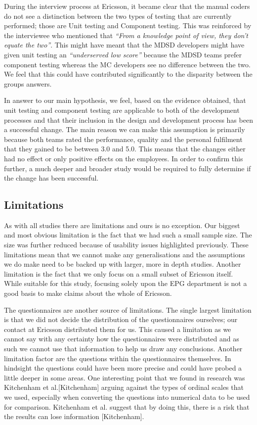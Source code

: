 \documentclass[final_report_innit.tex]{subfiles}
\begin{document}
During the interview process at Ericsson, it became clear that the manual coders do not see a distinction between the two types of
testing that are currently performed; those are Unit testing and Component testing. This was reinforced by the interviewee who mentioned that \textit{``From a knowledge point of view, they don't equate the two''}. This might have meant that the MDSD developers might have given unit testing an \textit{``underserved low score''} because the MDSD teams prefer component testing whereas the MC developers see no difference between the two. We feel that this could have contributed significantly to the disparity between the groups answers.

In answer to our main hypothesis, we feel, based on the evidence obtained, that unit testing and component testing are applicable to both of the development processes and that their inclusion in the design and development process has been a successful change. The main reason we can make this assumption is primarily because both teams rated the performance, quality and the personal fulfilment that they gained to be between 3.0 and 5.0. This means that the changes either had no effect or only positive effects on the employees. In order to confirm this further, a much deeper and broader study would be required to fully determine if the change has been successful.

\subsection*{Limitations}

As with all studies there are limitations and ours is no exception. Our biggest and most obvious limitation is the fact that we had such a small sample size. The size was further reduced because of usability issues highlighted previously. These limitations mean that we cannot make any generalisations and the assumptions we do make need to be backed up with larger, more in depth studies. Another limitation is the fact that we only focus on a small subset of Ericsson itself. While suitable for this study, focusing solely upon the EPG department is not a good basis to make claims about the whole of Ericsson.

The questionnaires are another source of limitations. The single largest limitation is that we did not decide the distribution of the questionnaires ourselves; our contact at Ericsson distributed them for us. This caused a limitation as we cannot say with any certainty how the questionnaires were distributed and as such we cannot use that information to help us draw any conclusions. Another limitation factor are the questions within the questionnaires themselves. In hindsight the questions could have been more precise and could have probed a little deeper in some areas. One interesting point that we found in research was Kitchenham et al.[Kitchenham] arguing against the types of ordinal scales that we used, especially when converting the questions into numerical data to be used for comparison. Kitchenham et al. suggest that by doing this, there is a risk that the results can lose information [Kitchenham].
\end{document}
